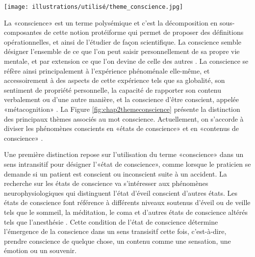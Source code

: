 \begin{figure*}[!t]
\center
\texttt{[image: illustrations/utilisé/theme\_conscience.jpg]}
\caption[Différents thèmes de recherche sur la conscience et proposition sur la manière dont ils s'articulent]{Différents thèmes de recherche sur la conscience, et proposition sur la manière dont ils s'articulent. Image réadaptée de celle de \cite{khamassi2021neurosciences} : Figure 6.1.}
\label{fig:chap2themeconscience}
\end{figure*}

La «conscience» est un terme polysémique et c'est la décomposition en sous-composantes de cette notion protéiforme qui permet de proposer des définitions opérationnelles, et ainsi de l'étudier de façon scientifique. 
La conscience semble désigner l'ensemble de ce que l'on peut saisir personnellement de sa propre vie mentale, et par extension ce que l'on devine de celle des autres \citep{khamassi2021neurosciences}. 
La conscience se réfère ainsi principalement à l'expérience phénoménale elle-même, et accessoirement à des aspects de cette expérience tels que sa globalité, son sentiment de propriété personnelle, la capacité de rapporter son contenu verbalement ou d'une autre manière, et la conscience d'être conscient, appelée «métacognition» \citep{ward2004attention}. 
La Figure \ref{fig:chap2themeconscience} présente la distinction des principaux thèmes associés au mot conscience. 
Actuellement, on s'accorde à diviser les phénomènes conscients en «états de conscience» et en «contenus de conscience» \citep{aru2012distilling, dehaene2006conscious, khamassi2021neurosciences}. 

Une première distinction repose sur l'utilisation du terme «conscience» dans un sens intransitif pour désigner l'«état de conscience», comme lorsque le praticien se demande si un patient est conscient ou inconscient suite à un accident. 
La recherche sur les états de conscience va s'intéresser aux phénomènes neurophysiologiques qui distinguent l'état d'éveil conscient d'autres états. 
Les états de conscience font référence à différents niveaux soutenus d'éveil ou de veille tels que le sommeil, la méditation, le coma et d'autres états de conscience altérés tels que l'anesthésie \citep{farthing1992psychology}. 
Cette condition de l'état de conscience détermine l'émergence de la conscience dans un sens transisitf cette fois, c'est-à-dire, prendre conscience de quelque chose, un contenu comme une sensation, une émotion ou un souvenir. 

